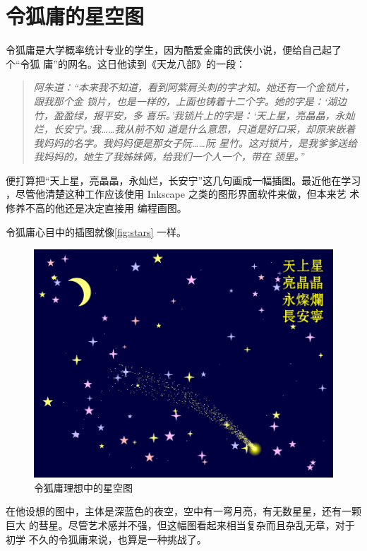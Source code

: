 
\chapter{令狐庸的星空图}
\label{chap:stars}

令狐庸是大学概率统计专业的学生，因为酷爱金庸的武侠小说，便给自己起了个“令狐
庸”的网名。这日他读到《天龙八部》的一段：
\begin{quotation}
\itshape
阿朱道：“本来我不知道，看到阿紫肩头刺的字才知。她还有一个金锁片，跟我那个金
锁片，也是一样的，上面也铸着十二个字。她的字是：‘湖边竹，盈盈绿，报平安，多
喜乐。’我锁片上的字是：‘天上星，亮晶晶，永灿烂，长安宁。’我……我从前不知
道是什么意思，只道是好口采，却原来嵌着我妈妈的名字。我妈妈便是那女子阮……阮
星竹。这对锁片，是我爹爹送给我妈妈的，她生了我姊妹俩，给我们一个人一个，带在
颈里。”
\end{quotation}
便打算把“天上星，亮晶晶，永灿烂，长安宁”这几句画成一幅插图。最近他在学习
\Asy{}，尽管他清楚这种工作应该使用 Inkscape 之类的图形界面软件来做，但本来艺
术修养不高的他还是决定直接用 \Asy{} 编程画图。

令狐庸心目中的插图就像\autoref{fig:stars} 一样。
\begin{figure}[htpb]
  \centering
  \includegraphics{stars.pdf}
  \caption{令狐庸理想中的星空图}
  \label{fig:stars}
\end{figure}

在他设想的图中，主体是深蓝色的夜空，空中有一弯月亮，有无数星星，还有一颗巨大
的彗星。尽管艺术感并不强，但这幅图看起来相当复杂而且杂乱无章，对于初学 \Asy{}
不久的令狐庸来说，也算是一种挑战了。


